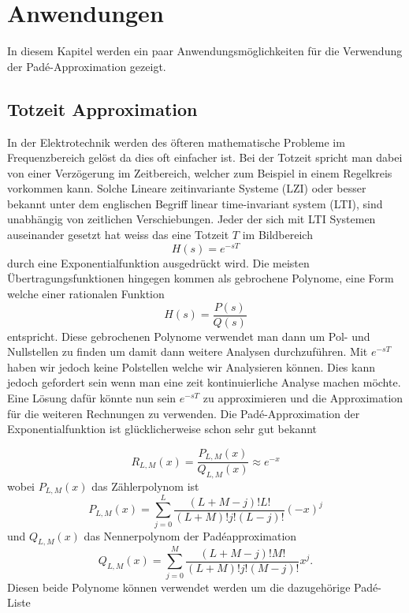 %
%
%
\section{Anwendungen
\label{pade:section:Anwendungen}}

In diesem Kapitel werden ein paar Anwendungsmöglichkeiten für die Verwendung der Padé-Approximation gezeigt.



\subsection{Totzeit Approximation
\label{pade:subsection:totzeit}}

In der Elektrotechnik werden des öfteren mathematische Probleme im Frequenzbereich gelöst da dies oft einfacher ist.
Bei der Totzeit spricht man dabei von einer Verzögerung im Zeitbereich, welcher zum Beispiel in einem Regelkreis vorkommen kann.
Solche Lineare zeitinvariante Systeme (LZI) oder besser bekannt unter dem englischen Begriff linear time-invariant system (LTI), sind unabhängig von zeitlichen Verschiebungen. 
Jeder der sich mit LTI Systemen auseinander gesetzt hat weiss das eine Totzeit $T$ im Bildbereich
\begin{equation*}
H(s) = e^{-sT}
\end{equation*}
durch eine Exponentialfunktion ausgedrückt wird.
Die meisten Übertragungsfunktionen hingegen kommen als gebrochene Polynome, eine Form welche einer rationalen Funktion
\begin{equation*}
H(s)=\frac{P(s)}{Q(s)}
\end{equation*}
entspricht.
Diese gebrochenen Polynome verwendet man dann um Pol- und Nullstellen zu finden um damit dann weitere Analysen durchzuführen. 
Mit $e^{-sT}$ haben wir jedoch keine Polstellen welche wir Analysieren können.
Dies kann jedoch gefordert sein wenn man eine zeit kontinuierliche Analyse machen möchte.
Eine Lösung dafür könnte nun sein $e^{-sT}$ zu approximieren und die Approximation für die weiteren Rechnungen zu verwenden.
Die Padé-Approximation der Exponentialfunktion ist glücklicherweise schon sehr gut bekannt \cite{pade:moler}

\begin{equation}
R_{L, M}(x)
=
\frac{P_{L, M}(x)}{Q_{L, M}(x)} \approx e^{-x}
\end{equation}
wobei $P_{L, M}(x)$ das Zählerpolynom ist
\begin{equation}
P_{L, M}(x)
=
\sum_{j=0}^{L} \frac{(L+M-j) ! L !}{(L+M) ! j !(L-j) !}(-x)^{j}
\end{equation}
und $Q_{L, M}(x)$ das Nennerpolynom der Padéapproximation
\begin{equation}
Q_{L, M}(x)
=
\sum_{j=0}^{M} \frac{(L+M-j) ! M !}{(L+M) ! j !(M-j) !} x^{j}.
\end{equation}
Diesen beide Polynome können verwendet werden um die dazugehörige Padé-Liste 

